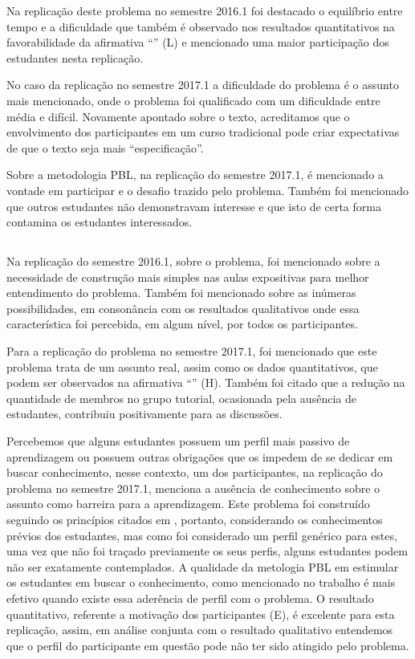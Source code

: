 Na replicação deste problema no semestre 2016.1
foi destacado o equilíbrio entre tempo e a dificuldade
que também é observado nos resultados quantitativos
na favorabilidade da afirmativa ``\LikertPL'' (L)
e mencionado uma maior participação
dos estudantes nesta replicação.

No caso da replicação no semestre 2017.1 a dificuldade
do problema é o assunto mais mencionado, onde o problema foi
qualificado com um dificuldade entre média e difícil.
Novamente apontado sobre o texto, acreditamos que o
envolvimento dos participantes em um curso
tradicional pode criar expectativas de que o texto
seja mais ``especificação''.

Sobre a metodologia PBL, na replicação do semestre 2017.1,
é mencionado a vontade em participar e o desafio trazido
pelo problema.
Também foi mencionado que outros estudantes não
demonstravam interesse e que isto de certa forma
contamina os estudantes interessados.

\subsection{\ProblemaD}

Na replicação do semestre 2016.1, sobre o problema, foi mencionado
sobre a necessidade de construção mais simples nas aulas
expositivas para melhor entendimento do problema.
Também foi mencionado sobre as inúmeras possibilidades, em consonância
com os resultados qualitativos onde essa característica foi
percebida, em algum nível, por todos os participantes.

Para a replicação do problema no semestre 2017.1, foi mencionado
que este problema trata de um assunto real, assim como
os dados quantitativos, que podem ser observados
na afirmativa ``\LikertPH'' (H).
Também foi citado que a redução na quantidade de membros no grupo
tutorial, ocasionada pela ausência de estudantes, contribuiu
positivamente para as discussões.

Percebemos que alguns estudantes possuem um perfil mais passivo
de aprendizagem ou possuem outras obrigações que os impedem
de se dedicar em buscar conhecimento, nesse contexto,
um dos participantes, na replicação do problema no
semestre 2017.1, menciona a ausência de conhecimento
sobre o assunto como barreira para a aprendizagem.
Este problema foi construído seguindo
os princípios citados em \cite{dolmans1997seven},
portanto, considerando os conhecimentos prévios
dos estudantes, mas como foi considerado um perfil
genérico para estes, uma vez que não foi
traçado previamente os seus perfis, alguns estudantes
podem não ser exatamente contemplados.
A qualidade da metologia PBL em estimular os estudantes
em buscar o conhecimento, como mencionado no trabalho
\cite{savery2015overview} é mais efetivo quando
existe essa aderência de perfil com o problema.
O resultado quantitativo, referente a motivação dos
participantes (E), é excelente para esta
replicação, assim, em análise conjunta com o
resultado qualitativo entendemos que o perfil
do participante em questão pode não ter sido
atingido pelo problema.

